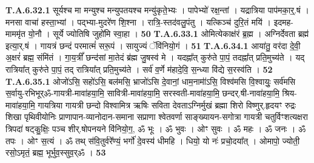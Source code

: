 \documentclass[17pt]{extarticle}
\begin{document}
                                                         \textbf{} \newline \newline
                                \textbf{ T.A.6.32.1} \newline
                  सूर्यश्च मा मन्युश्च मन्युपतयश्च मन्यु॑कृते॒भ्यः । पापेभ्यो॑ रक्ष॒न्तां । यद्रात्रिया पाप॑मका॒र्॒.षं ।  मनसा वाचा॑ हस्ता॒भ्यां । पद्भ्या-मुदरे॑ण शि॒श्ना ।  रात्रि॒-स्तद॑वलु॒पंतु । यत्किञ्च॑ दुरि॒तं मयि॑ ।  इदमह-माममृ॑त यो॒नौ । सूर्ये ज्योतिषि जुहो॑मि स्वा॒हा । \textbf{ 50} \newline
                  \newline
                                                         \textbf{} \newline \newline
                                \textbf{ T.A.6.33.1} \newline
                  ओमित्येकाक्ष॑रं ब्र॒ह्म । अग्निर्देवता ब्रह्म॑ इत्या॒र्.षं । गायत्रं छन्दं परमात्मं॑ सरू॒पं । सायुज्यं ॅवि॑नियो॒गं । \textbf{ 51} \newline
                  \newline
                                                         \textbf{} \newline \newline
                                \textbf{ T.A.6.34.1} \newline
                  आया॑तु॒ वर॑दा दे॒वी॒ अ॒क्षरं॑ ब्रह्म॒ संमि॑तं ।  गा॒य॒त्रीं᳚ छन्द॑सां मा॒तेदं ब्र॑ह्म जु॒षस्व॑ मे ।  यदह्ना᳚त् कुरु॑ते पा॒पं॒ तदह्ना᳚त् प्रति॒मुच्य॑ते ।  यद् रात्रिया᳚त् कुरु॑ते पा॒पं॒ तद् रात्रिया᳚त् प्रति॒मुच्य॑ते ।  सर्व॑ व॒र्णे म॑हादे॒वि॒ स॒न्ध्या वि॑द्ये स॒रस्व॑ति । \textbf{ 52} \newline
                  \newline
                                                         \textbf{} \newline \newline
                                \textbf{ T.A.6.35.1} \newline
                  ओजो॑ऽसि॒ सहो॑ऽसि॒ बल॑मसि॒ भ्राजो॑ऽसि दे॒वानां॒ धाम॒नामा॑॑ऽसि॒ विश्व॑मसि वि॒श्वायुः॒ सर्व॑मसि स॒र्वायु-रभिभूर्ॐ-गायत्री-मावा॑हया॒मि॒  सावित्री-मावा॑हया॒मि॒ सरस्वती-मावा॑हया॒मि॒ छन्दर्.षी-नावा॑हया॒मि॒ श्रिय-मावा॑हया॒मि॒ गायत्रिया गायत्री छन्दो विश्वामित्र ऋषिः सविता देवताऽग्निर्मुखं ब्रह्मा शिरो विष्णुर्.हृदयꣳ रुद्रः  शिखा पृथिवीयोनिः प्राणापान-व्यानोदान-समाना सप्राणा श्वेतवर्णा साङ्ख्यायन-सगोत्रा गायत्री चतुर्विꣳशत्यक्षरा त्रिपदा॑ षट्कु॒क्षिः॒ पञ्च शीर्.षोपनयने वि॑नियो॒ग॒,  ॐ भूः । ॐ भुवः । ओꣳ सुवः । ॐ महः । ॐ जनः ।  ॐ तपः । ओꣳ स॒त्यं । ॐ तथ् स॑वि॒तुर्वरे᳚ण्यं॒ भर्गो॑ दे॒वस्य॑ धीमहि ।  धियो॒ यो नः॑ प्रचो॒दया᳚त् ।  ओमापो॒ ज्योती॒ रसो॒ऽमृतं॒ ब्रह्म॒ भूर्भुव॒स्सुव॒र्ॐ । \textbf{ 53} \newline
\end{document}
